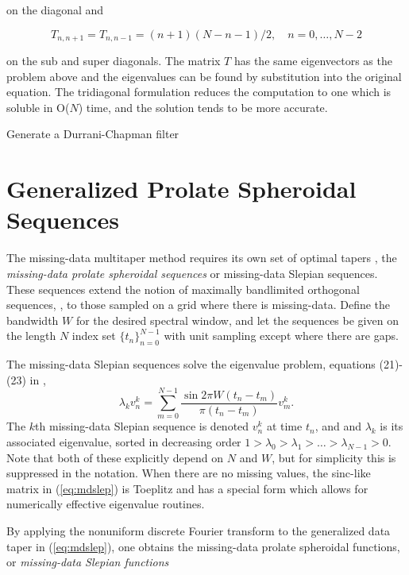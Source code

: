 \documentclass[preprint,12pt]{elsarticle}
\begin{document}
on the diagonal and 

\begin{equation} T_{n, n + 1} = T_{n, n-1} = (n + 1)(N - n - 1)/2, \quad n = 0, \ldots, N-2\end{equation}

on the sub and super diagonals. The matrix $T$ has the same eigenvectors as the
problem above and the eigenvalues can be found by substitution into the original
equation. The tridiagonal formulation reduces the computation to one which is soluble
in O($N$) time, and the solution tends to be more accurate.

Generate a Durrani-Chapman filter \cite{durranic84}

\section{Generalized Prolate Spheroidal Sequences }
 
The missing-data multitaper method requires its own set of optimal tapers
\cite{T82,bronez88,chave2019multitaper}, the \emph{missing-data prolate spheroidal
sequences} or missing-data Slepian sequences. These sequences extend the notion of
maximally bandlimited orthogonal sequences, \cite{S78}, to those sampled on a grid
where there is missing-data.  Define the bandwidth $W$ for the desired spectral
window, and let the sequences be given on the length $N$ index set
$\{t_n\}_{n=0}^{N-1}$ with unit sampling except where there are gaps. 

The missing-data Slepian sequences solve the eigenvalue problem, equations (21)-(23) in \cite{Chave2019},
\begin{equation} \label{eq:mdslep} 
  \lambda_k v^{k}_{n} = \sum_{m=0}^{N-1} \frac{\sin 2\pi W (t_n - t_m) }{\pi (t_n - t_m)} v^{k}_{m}.\end{equation}
The $k$th missing-data Slepian sequence is denoted $v^{k}_{n}$ at time $t_n$, and
and $\lambda_k$ is its associated eigenvalue, sorted in decreasing order
$1>\lambda_0>\lambda_1>\ldots>\lambda_{N-1}>0$. Note that both of these explicitly
depend on $N$ and $W$, but for simplicity this is suppressed in the notation. When
there are no missing values, the sinc-like matrix in (\ref{eq:mdslep}) is
Toeplitz and has a special form which allows for numerically effective eigenvalue
routines.  

By applying the nonuniform discrete Fourier transform to the generalized data taper
in (\ref{eq:mdslep}), one obtains the missing-data prolate spheroidal functions, or
\emph{missing-data Slepian functions}
\end{document}
